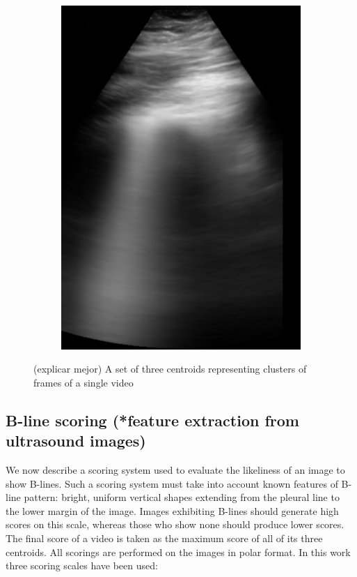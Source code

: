 \documentclass[11pt]{article} %
\begin{document}
\begin{figure}
\begin{subfigure}{0.3\textwidth}
		\includegraphics[width=\textwidth]{figuras/centroid_2.jpg}
		\end{subfigure}
	\caption{\color{red} (explicar mejor) A set of three centroids representing clusters of frames of a single 		video}
	\end{figure}

	

\subsection{B-line scoring (*feature extraction from ultrasound images)}

	We now describe a scoring system used to evaluate the likeliness of an image to show B-lines. Such a scoring system must take into account known features of B-line pattern: bright, uniform vertical shapes extending from the pleural line to the lower margin of the image. Images exhibiting B-lines should generate high scores on this scale, whereas those who show none should produce lower scores. The final score of a video is taken as the maximum score of all of its three centroids. All scorings are performed on the images in polar format. In this work three scoring scales have been used:
	
\end{document}
